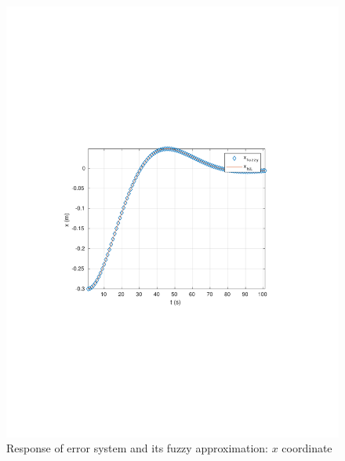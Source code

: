 \begin{frame}
\begin{figure}[!htb]
	\centering
	\includegraphics[scale=0.7,trim={3.5cm 8cm 4cm 8cm},clip]{figuras/OL/x.pdf} 
	\caption{Response of error system and its fuzzy approximation: $x$ coordinate} \label{fig:OL_x}
\end{figure} 
\end{frame}


